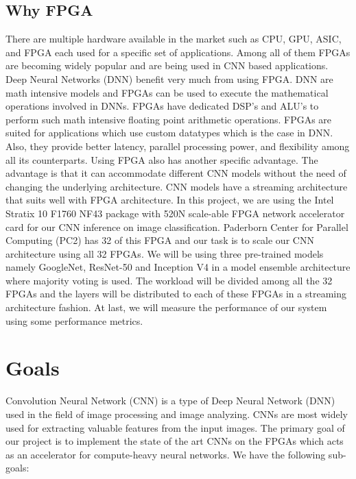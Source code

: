 \documentclass[titlepage]{report}
\begin{document}
\section{Why FPGA}
There are multiple hardware available in the market such as CPU, GPU, ASIC, and FPGA each used for a specific set of applications. Among all of them FPGAs are becoming widely popular and are being used in CNN based applications. Deep Neural Networks (DNN) benefit very much from using FPGA. DNN are math intensive models and FPGAs can be used to execute the mathematical operations involved in DNNs. FPGAs have dedicated DSP's and ALU's to perform such math intensive floating point arithmetic operations. FPGAs are suited for applications which use custom datatypes which is the case in DNN. Also, they provide better latency, parallel processing power, and flexibility among all its counterparts. Using FPGA also has another specific advantage. The advantage is that it can accommodate different CNN models without the need of changing the underlying architecture. CNN models have a streaming architecture that suits well with FPGA architecture.
In this project, we are using the Intel Stratix 10 F1760 NF43 package with 520N scale-able FPGA network accelerator card for our CNN inference on image classification. Paderborn Center for Parallel Computing (PC2) has 32 of this FPGA and our task is to scale our CNN architecture using all 32 FPGAs. We will be using three pre-trained models namely GoogleNet, ResNet-50 and Inception V4 in a model ensemble architecture where majority voting is used. The workload will be divided among all the 32 FPGAs and the layers will be distributed to each of these FPGAs in a streaming architecture fashion. At last, we will measure the performance of our system using some performance metrics.





\chapter{Goals}
Convolution Neural Network (CNN) is a type of Deep Neural Network (DNN) used in the field of image processing and image analyzing. CNNs are most widely used for extracting valuable features from the input images. The primary goal of our project is to implement the state of the art CNNs on the FPGAs which acts as an accelerator for compute-heavy neural networks. We have the following sub-goals:
\end{document}
